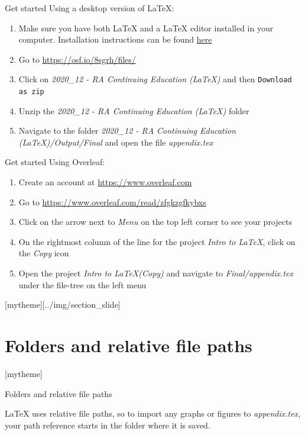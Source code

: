 \documentclass[aspectratio=169]{beamer}
\newcommand{\sectionpic}[2]{
	\setbeamertemplate{section page}[mytheme][#2]
	\section{#1}
	\setbeamertemplate{section page}[mytheme]
}
\begin{document}
\begin{frame}{Get started}
	Using a desktop version of \LaTeX:
	\begin{enumerate}
		\item Make sure you have both {\LaTeX} and a {\LaTeX} editor installed in your computer. Installation instructions can be found \textcolor{blue}{\href{https://github.com/worldbank/DIME-LaTeX-Templates/blob/master/Set\%20up\%20LaTeX\%20on\%20your\%20computer/How\%20to\%20set\%20up\%20TeXstudio.pdf}{here}}
		\item Go to \url{https://osf.io/8sgrh/files/}
		\item Click on \textit{2020\_12 - RA Continuing Education ({\LaTeX})} and then \texttt{Download as zip}
		\item Unzip the \textit{2020\_12 - RA Continuing Education ({\LaTeX})} folder
		\item Navigate to the folder \textit{2020\_12 - RA Continuing Education ({\LaTeX})/Output/Final} and open the file \textit{appendix.tex}
	\end{enumerate}
\end{frame}

\begin{frame}{Get started}
	Using Overleaf:
	\begin{enumerate}
		\item Create an account at \url{https://www.overleaf.com}
		\item Go to \url{https://www.overleaf.com/read/zfgkzgfkybxs}
		\item Click on the arrow next to \emph{Menu} on the top left corner to see your projects
		\item On the rightmost column of the line for the project \textit{Intro to \LaTeX}, click on the \textit{Copy} icon
		\item Open the project \textit{Intro to \LaTeX(Copy)} and navigate to \textit{Final/appendix.tex} under the file-tree on the left menu
	\end{enumerate}
\end{frame}

\sectionpic{Folders and relative file paths}{../img/section_slide}

\begin{frame}{Folders and relative file paths}
	\begin{tcolorbox}[colback=white,colframe=orange,title=\textbf{Important!}]
		{\LaTeX} uses relative file paths, so to import any graphs or figures to \textit{appendix.tex}, your path reference starts in the folder where it is saved.
	\end{tcolorbox}
\end{frame}
\end{document}
